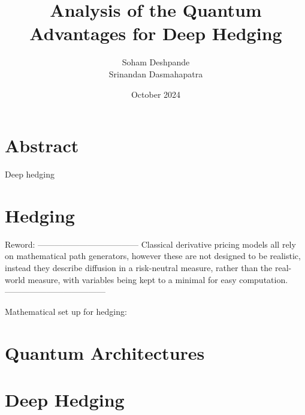 \documentclass{article}
\title{Analysis of the Quantum Advantages for Deep Hedging}
\author{Soham Deshpande\\ Srinandan Dasmahapatra}
\date{October 2024}
\begin{document}
\maketitle

\tableofcontents

\clearpage

\section{Abstract}
Deep hedging

\clearpage
\section{Hedging}
Reword: 
------------------------------------
Classical derivative pricing models all rely on mathematical path generators,
however these are not designed to be realistic, instead they describe diffusion
in a risk-neutral measure, rather than the real-world measure, with variables
being kept to a minimal for easy computation. 
------------------------------------

Mathematical set up for hedging:


\clearpage
\section{Quantum Architectures}


\clearpage
\section{Deep Hedging}
\end{document}
